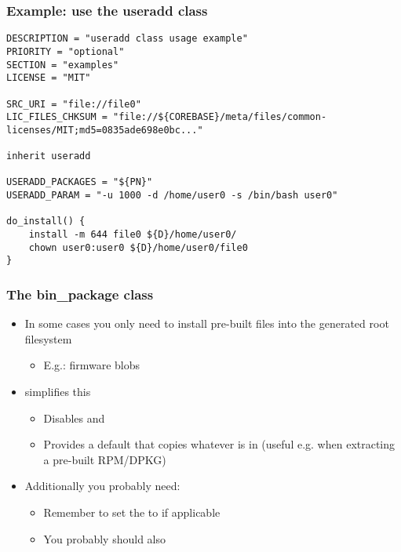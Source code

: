 \begin{frame}[fragile]
  \frametitle{Example: use the useradd class}
  \begin{block}{}
    \begin{verbatim}
DESCRIPTION = "useradd class usage example"
PRIORITY = "optional"
SECTION = "examples"
LICENSE = "MIT"

SRC_URI = "file://file0"
LIC_FILES_CHKSUM = "file://${COREBASE}/meta/files/common-licenses/MIT;md5=0835ade698e0bc..."

inherit useradd

USERADD_PACKAGES = "${PN}"
USERADD_PARAM = "-u 1000 -d /home/user0 -s /bin/bash user0"

do_install() {
    install -m 644 file0 ${D}/home/user0/
    chown user0:user0 ${D}/home/user0/file0
}
    \end{verbatim}
  \end{block}
\end{frame}

\begin{frame}
  \frametitle{The bin\_package class}
  \begin{itemize}
    \item In some cases you only need to install pre-built files into the
      generated root filesystem
      \begin{itemize}
        \item E.g.: firmware blobs
      \end{itemize}
    \item {} simplifies this
      \begin{itemize}
        \item Disables  and 
        \item Provides a default  that copies whatever is
          in  (useful e.g. when extracting a pre-built RPM/DPKG)
      \end{itemize}
    \item Additionally you probably need:
      \begin{itemize}
        \item Remember to set the  to  if applicable
        \item You probably should also 
      \end{itemize}
  \end{itemize}
\end{frame}


